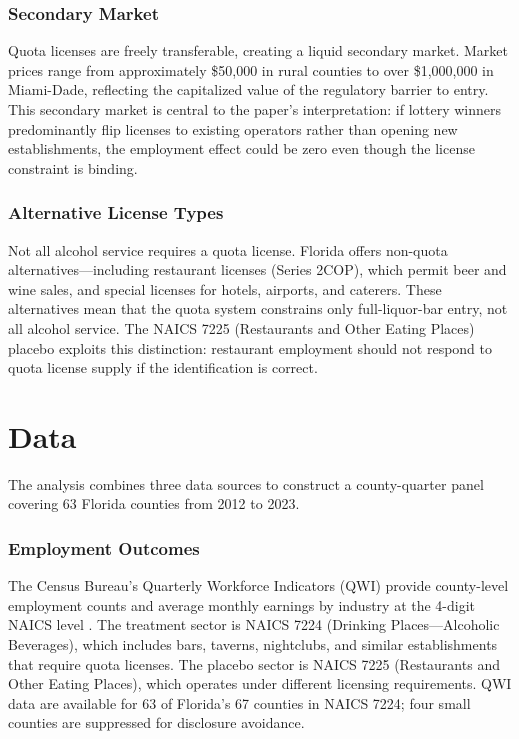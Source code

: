 \documentclass[12pt]{article}
\begin{document}
\subsubsection*{Secondary Market} Quota licenses are freely transferable, creating a liquid secondary market. Market prices range from approximately \$50,000 in rural counties to over \$1,000,000 in Miami-Dade, reflecting the capitalized value of the regulatory barrier to entry. This secondary market is central to the paper's interpretation: if lottery winners predominantly flip licenses to existing operators rather than opening new establishments, the employment effect could be zero even though the license constraint is binding.

\subsubsection*{Alternative License Types} Not all alcohol service requires a quota license. Florida offers non-quota alternatives---including restaurant licenses (Series 2COP), which permit beer and wine sales, and special licenses for hotels, airports, and caterers. These alternatives mean that the quota system constrains only full-liquor-bar entry, not all alcohol service. The NAICS 7225 (Restaurants and Other Eating Places) placebo exploits this distinction: restaurant employment should not respond to quota license supply if the identification is correct.

\section{Data}

The analysis combines three data sources to construct a county-quarter panel covering 63 Florida counties from 2012 to 2023.

\subsubsection*{Employment Outcomes} The Census Bureau's Quarterly Workforce Indicators (QWI) provide county-level employment counts and average monthly earnings by industry at the 4-digit NAICS level \citep{abowd2009}. The treatment sector is NAICS 7224 (Drinking Places---Alcoholic Beverages), which includes bars, taverns, nightclubs, and similar establishments that require quota licenses. The placebo sector is NAICS 7225 (Restaurants and Other Eating Places), which operates under different licensing requirements. QWI data are available for 63 of Florida's 67 counties in NAICS 7224; four small counties are suppressed for disclosure avoidance.
\end{document}
